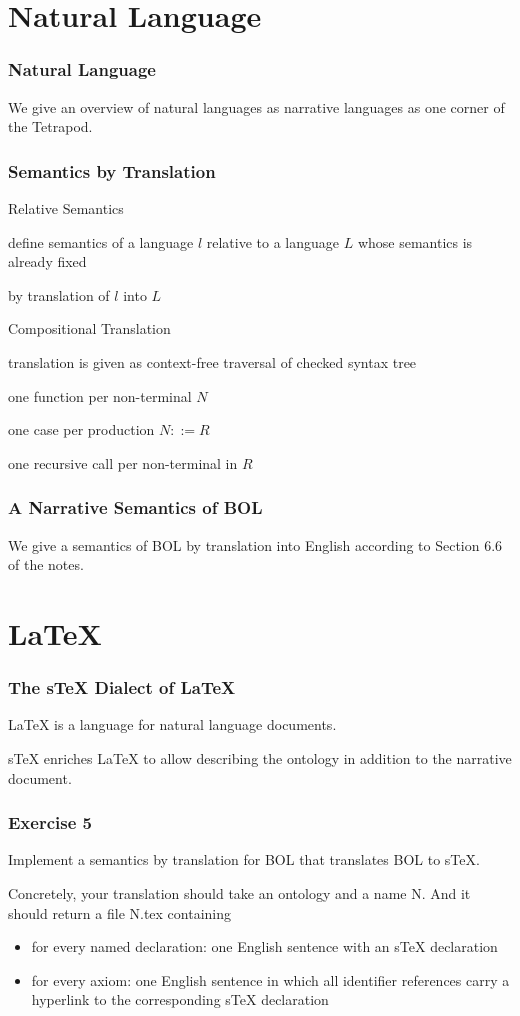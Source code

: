 \section{Natural Language}

\begin{frame}\frametitle{Natural Language}
We give an overview of natural languages as narrative languages as one corner of the Tetrapod.
\end{frame}

\begin{frame}\frametitle{Semantics by Translation}
\begin{blockitems}{Relative Semantics}
\item define semantics of a language $l$ relative to a language $L$ whose semantics is already fixed
\item by translation of $l$ into $L$
\end{blockitems}

\begin{blockitems}{Compositional Translation}
\item translation is given as context-free traversal of checked syntax tree
\item one function per non-terminal $N$
\item one case per production $N ::= R$
\item one recursive call per non-terminal in $R$
\end{blockitems}
\end{frame}

\begin{frame}\frametitle{A Narrative Semantics of BOL}
We give a semantics of BOL by translation into English according to Section 6.6 of the notes.
\end{frame}

\section{LaTeX}

\begin{frame}\frametitle{The sTeX Dialect of LaTeX}
LaTeX is a language for natural language documents.

sTeX enriches LaTeX to allow describing the ontology in addition to the narrative document.
\end{frame}

\begin{frame}\frametitle{Exercise 5}
Implement a semantics by translation for BOL that translates BOL to sTeX.

Concretely, your translation should take an ontology and a name N.
And it should return a file N.tex containing
\begin{itemize}
 \item for every named declaration: one English sentence with an sTeX declaration
 \item for every axiom: one English sentence in which all identifier references carry a hyperlink to the corresponding sTeX declaration
\end{itemize}
\end{frame}
